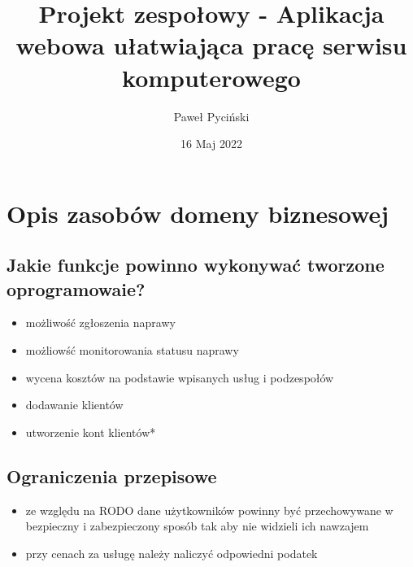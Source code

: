 \documentclass{article}
\title{Projekt zespołowy - Aplikacja webowa ułatwiająca pracę serwisu komputerowego}
\author{Paweł Pyciński }
\date{16 Maj 2022}
\begin{document}
\maketitle

\section{Opis zasobów domeny biznesowej}
\subsection{Jakie funkcje powinno wykonywać tworzone oprogramowaie?}
\begin{itemize}
    \item możliwość zgłoszenia naprawy
    \item możliowść monitorowania statusu naprawy
    \item wycena kosztów na podstawie wpisanych usług i podzespołów
    \item dodawanie klientów
    \item utworzenie kont klientów*
\end{itemize}


\subsection{Ograniczenia przepisowe}
\begin{itemize}
    \item ze względu na RODO dane użytkowników powinny być przechowywane w bezpieczny i zabezpieczony sposób tak aby nie widzieli ich nawzajem
    \item przy cenach za usługę należy naliczyć odpowiedni podatek
\end{itemize}
\end{document}
